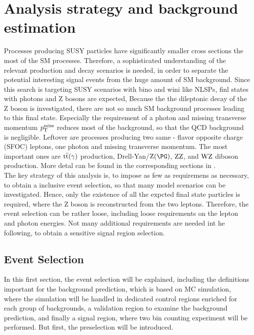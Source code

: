\chapter{Analysis strategy and background estimation}\label{chap:analysis}

Processes producing SUSY particles have significantly smaller cross sections the most of the SM processes. Therefore, a sophisticated understanding of the relevant production and decay scenarios is needed, in order to separate the potential interesting signal events from the huge amount of SM background. Since this search is targeting SUSY scenarios with bino and wini like NLSPs, finl states with photons and Z bosons are expected, Because the the dileptonic decay of the Z boson is investigated, there are not so much SM background processes leading to this final state. Especially the requirement of a photon and missing transverse momentum $p_{\mathrm{T}}^\text{miss}$ reduces most of the background, so that \eg the QCD background is negligible. Leftover are processes producing two same - flavor opposite charge (SFOC) leptons, one photon and missing transverse momentum. The most important ones are ${\mathrm{t}\overline{\mathrm{t}}}(\gamma)$ production, Drell-Yan/$\PZ(\PG)$, $\mathrm{Z}\mathrm{Z}$, and $\mathrm{W}\mathrm{Z}$ diboson production. More detal can be found in the corresponding sections in .\\
The key strategy of this analysis is, to impose as few as requiremens as necessary, to obtain a inclusive event selection, so that many model scenarios can be investigated. Hence, only the existence of all the expcted final state particles is required, where the Z boson is reconstructed from the two leptons. Therefore, the event selection can be rather loose, including loose requirements on the lepton and photon energies. Not many additional requirements are needed int he following, to obtain a sensitive signal region selection.

\section{Event Selection}
In this first section, the event selection will be explained, including the definitions important for the background prediction, which is based on MC simulation, where the simulation will be handled in dedicated control regions enriched for each group of backgrounds, a validation region to examine the background prediction, and finally a signal region, where two bin counting experiment will be performed. But first, the preselection will be introduced.
